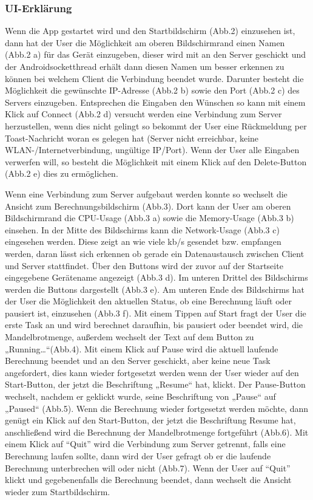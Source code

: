 \documentclass[12pt, onecolumn, notitlepage]{scrartcl}
\begin{document}
\subsubsection{UI-Erklärung}
Wenn die App gestartet wird und den Startbildschirm (Abb.2) einzusehen ist, dann hat der User die Möglichkeit am oberen Bildschirmrand einen Namen (Abb.2 a) für das Gerät einzugeben, dieser wird mit an den Server geschickt und der Androidsocketthread erhält dann diesen Namen um besser erkennen zu können bei welchem Client die Verbindung beendet wurde. Darunter besteht die Möglichkeit die gewünschte IP-Adresse (Abb.2 b) sowie den Port (Abb.2 c) des Servers einzugeben. Entsprechen die Eingaben den Wünschen so kann mit einem Klick auf Connect (Abb.2 d) versucht werden eine Verbindung zum Server herzustellen, wenn dies nicht gelingt so bekommt der User eine Rückmeldung per Toast-Nachricht woran es gelegen hat (Server nicht erreichbar, keine WLAN-/Internetverbindung, ungültige IP/Port). Wenn der User alle Eingaben verwerfen will, so besteht die Möglichkeit mit einem Klick auf den Delete-Button (Abb.2 e) dies zu ermöglichen. \par
Wenn eine Verbindung zum Server aufgebaut werden konnte so wechselt die Ansicht zum Berechnungsbildschirm (Abb.3). Dort kann der User am oberen Bildschirmrand die CPU-Usage (Abb.3 a) sowie die Memory-Usage (Abb.3 b) einsehen. In der Mitte des Bildschirms kann die Network-Usage (Abb.3 c) eingesehen werden. Diese zeigt an wie viele kb/s gesendet bzw. empfangen werden, daran lässt sich erkennen ob gerade ein Datenaustausch zwischen Client und Server stattfindet. Über den Buttons wird der zuvor auf der Startseite eingegebene Gerätename angezeigt (Abb.3 d). Im unteren Drittel des Bildschirms werden die Buttons dargestellt (Abb.3 e). Am unteren Ende des Bildschirms hat der User die Möglichkeit den aktuellen Status, ob eine Berechnung läuft oder pausiert ist, einzusehen (Abb.3 f). Mit einem Tippen auf Start fragt der User die erste Task an und wird berechnet daraufhin, bis pausiert oder beendet wird, die Mandelbrotmenge, außerdem wechselt der Text auf dem Button zu „Running…“(Abb.4). Mit einem Klick auf Pause wird die aktuell laufende Berechnung beendet und an den Server geschickt, aber keine neue Task angefordert, dies kann wieder fortgesetzt werden wenn der User wieder auf den Start-Button, der jetzt die Beschriftung „Resume“ hat, klickt. Der Pause-Button wechselt, nachdem er geklickt wurde, seine Beschriftung von „Pause“ auf „Paused“ (Abb.5). Wenn die Berechnung wieder fortgesetzt werden möchte, dann genügt ein Klick auf den Start-Button, der jetzt die Beschriftung Resume hat, anschließend wird die Berechnung der Mandelbrotmenge fortgeführt (Abb.6). Mit einem Klick auf \enquote{Quit} wird die Verbindung zum Server getrennt, falls eine Berechnung laufen sollte, dann wird der User gefragt ob er die laufende Berechnung unterbrechen will oder nicht (Abb.7). Wenn der User auf \enquote{Quit} klickt und gegebenenfalls die Berechnung beendet, dann wechselt die Ansicht wieder zum Startbildschirm. \\ \\
\end{document}

